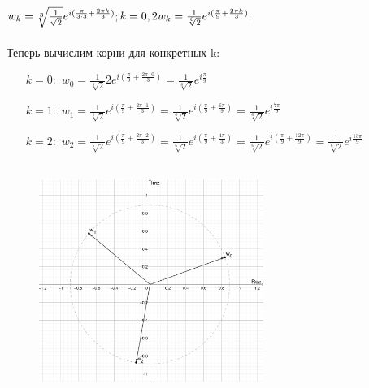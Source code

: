\documentclass[12pt, a4paper]{article}
\begin{document}
\begin{enumerate}
\begin{math}
            w_k = \sqrt[3]{\frac{1}{\sqrt{2}}}e^{i(\frac{\pi}{3\cdot3} + \frac{2\pi k}{3})} ; k = \overline{0,2}\\ 
            w_k = \frac{1}{\sqrt[6]{2}}e^{i(\frac{\pi}{9} + \frac{2\pi k}{3})}.
        \end{math} \\\\
        Теперь вычислим корни для конкретных k:
        \begin{enumerate}
            \item [$k = 0:$] 
            \begin{math}
                w_0 = \frac{1}{\sqrt[6]{2}}{2}e^{i(\frac{\pi}{9} + \frac{2\pi \cdot0}{3})} = 
                \frac{1}{\sqrt[6]{2}}e^{i\frac{\pi}{9}}
            \end{math}
            \item [$k = 1:$]
            \begin{math}
                w_1 = \frac{1}{\sqrt[6]{2}}e^{i(\frac{\pi}{9} + \frac{2\pi \cdot1}{3})} = 
                \frac{1}{\sqrt[6]{2}}e^{i(\frac{\pi}{9} + \frac{6\pi}{9})} = 
                \frac{1}{\sqrt[6]{2}}e^{i\frac{7\pi}{9}}
            \end{math}
            \item [$k = 2:$]
            \begin{math}
                w_2 = \frac{1}{\sqrt[6]{2}}e^{i(\frac{\pi}{9} + \frac{2\pi \cdot2}{3})} =
                \frac{1}{\sqrt[6]{2}}e^{i(\frac{\pi}{9} + \frac{4\pi}{3})} = 
                \frac{1}{\sqrt[6]{2}}e^{i(\frac{\pi}{9} + \frac{12\pi}{9})} = 
                \frac{1}{\sqrt[6]{2}}e^{i\frac{13\pi}{9}}
            \end{math}\\\\
        \end{enumerate}
            \begin{figure}[h]
                \centering
                \includegraphics[width=0.65\textwidth]{task1-b.png}

\end{figure}
\end{enumerate}
\end{document}
